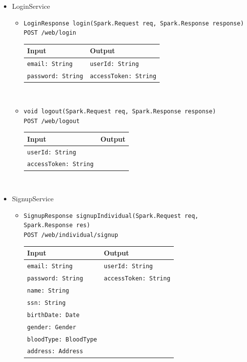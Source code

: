\documentclass[a4paper, hidelinks, 12pt]{report}
\begin{document}
	\begin{itemize}
		\item{LoginService}
		\begin{itemize}
			\item{\verb|LoginResponse login(Spark.Request req, Spark.Response response)|\\ \verb|POST /web/login|}\\
			\begin{tabular}{l | l}
			\textbf{Input} & \textbf{Output} \\
			\hline
			\verb|email: String| & \verb|userId: String| \\
			\verb|password: String| & \verb|accessToken: String|
			\end{tabular}\\
			\item{\verb|void logout(Spark.Request req, Spark.Response response)|\\ \verb|POST /web/logout|}\\
			\begin{tabular}{l | l}
			\textbf{Input} & \textbf{Output} \\
			\hline
			\verb|userId: String| & \\
			\verb|accessToken: String| & \\
			\end{tabular}\\
		\end{itemize}
		\item{SignupService}
		\begin{itemize}
			\item{\verb|SignupResponse signupIndividual(Spark.Request req, Spark.Response res)|\\ \verb|POST /web/individual/signup|}\\
			\begin{tabular}{l | l}
			\textbf{Input} & \textbf{Output} \\
			\hline
				\verb|email: String| & \verb|userId: String| \\
				\verb|password: String| & \verb|accessToken: String| \\
				\verb|name: String| & \\
				\verb|ssn: String| & \\
				\verb|birthDate: Date| & \\
				\verb|gender: Gender| & \\
				\verb|bloodType: BloodType| & \\
				\verb|address: Address| & \\

\end{tabular}
\end{itemize}
\end{itemize}
\end{document}
